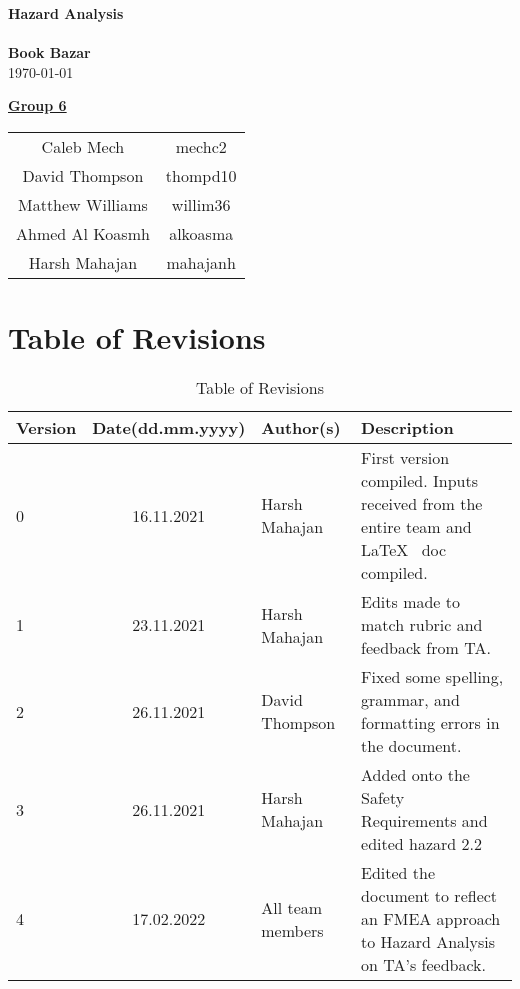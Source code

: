 \documentclass[fullpage]{article}
\begin{document}
\vspace*{\fill}
\begin{center}

  {\Huge \textbf{Hazard Analysis}}\\
\hrulefill\\[2mm]
  {\huge \textbf{Book Bazar}}\\[2mm]
{\large \today}\\[15mm]
{\large
\underline{\textbf{Group 6}}\\
\begin{tabular}{ c c }

 Caleb Mech & mechc2\\
 David Thompson & thompd10\\
 Matthew Williams & willim36\\
 Ahmed Al Koasmh & alkoasma\\
 Harsh Mahajan	& mahajanh
\end{tabular}
}

\end{center}

\vspace*{\fill}

\newpage
\begingroup
\hypersetup{hidelinks}
\tableofcontents

\listoftables
\endgroup
\newpage


\section*{Table of Revisions}
\begin{table}[h]
\centering
\begin{tabular}{| l | c | p{2.8cm}| p{3.5cm} |}
\hline
 \rowcolor{lightgray}
\textbf{Version} & \textbf{Date(dd.mm.yyyy)} &\textbf{Author(s)} &\textbf{Description}\\
\hline
0 & 16.11.2021 &  Harsh Mahajan & First version compiled. Inputs received from the entire team and \LaTeX~ doc compiled.\\
\hline
1 & 23.11.2021 &  Harsh Mahajan & Edits made to match rubric and feedback from TA.\\
\hline
2 & 26.11.2021 & David Thompson & Fixed some spelling, grammar, and formatting errors in the document. \\
\hline
3 & 26.11.2021 & Harsh Mahajan & Added onto the Safety Requirements and edited hazard 2.2\\
\hline
4& 17.02.2022& All team members & Edited the document to reflect an FMEA approach to Hazard Analysis on TA's feedback.\\
\hline
\end{tabular}
\caption{Table of Revisions}

\end{table}
\end{document}
